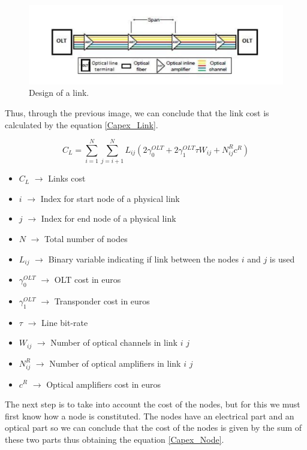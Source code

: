 \begin{figure}[h!]
\centering
\includegraphics[width=\textwidth]{sdf/ILP/figures/link_design}
\caption{Design of a link.}
\label{link_design}
\end{figure}

\newpage
Thus, through the previous image, we can conclude that the link cost is calculated by the equation \ref{Capex_Link}.

\begin{equation}
C_L = \sum_{i=1}^N \sum_{j=i+1}^N L_{ij} \left( 2 \gamma_0^{OLT} + 2 \gamma_1^{OLT} \tau W_{ij} + N^R_{ij} c^R \right)
\label{Capex_Link}
\end{equation}

\begin{itemize}
\item{$C_L$				$\rightarrow$	Links cost}
\item{$i$               $\rightarrow$   Index for start node of a physical link}
\item{$j$               $\rightarrow$   Index for end node of a physical link}
\item{$N$				$\rightarrow$	Total number of nodes}
\item{$L_{ij}$			$\rightarrow$	Binary variable indicating if link between the nodes $i$ and $j$ is used}
\item{$\gamma_0^{OLT}$	$\rightarrow$	OLT cost in euros}
\item{$\gamma_1^{OLT}$	$\rightarrow$	Transponder cost in euros}
\item{$\tau$		    $\rightarrow$	Line bit-rate}
\item{$W_{ij}$          $\rightarrow$   Number of optical channels in link $i$ $j$}
\item{$N^R_{ij}$    	$\rightarrow$	Number of optical amplifiers in link $i$ $j$}
\item{$c^R$				$\rightarrow$	Optical amplifiers cost in euros}
\end{itemize}


The next step is to take into account the cost of the nodes, but for this we must first know how a node is constituted. The nodes have an electrical part and an optical part so we can conclude that the cost of the nodes is given by the sum of these two parts thus obtaining the equation \ref{Capex_Node}.

